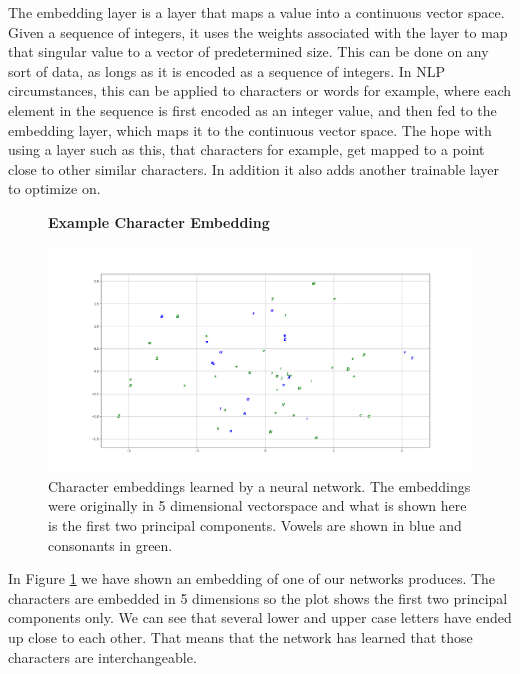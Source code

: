 \begin{description}
        The embedding layer is a layer that maps a value into a continuous
        vector space. Given a sequence of integers, it uses the weights
        associated with the layer to map that singular value to a vector of
        predetermined size. This can be done on any sort of data, as longs as it
        is encoded as a sequence of integers. In \gls{NLP} circumstances, this
        can be applied to characters or words for example, where each element in
        the sequence is first encoded as an integer value, and then fed to the
        embedding layer, which maps it to the continuous vector space. The hope
        with using a layer such as this, that characters for example, get mapped
        to a point close to other similar characters. In addition it also adds
        another trainable layer to optimize on.

        \begin{figure}
            \centering
            \textbf{Example Character Embedding}\par\medskip
            \includegraphics[width=\textwidth]{./pictures/method/example_character_embeddings.png}
            \caption{Character embeddings learned by a neural network. The
                embeddings were originally in 5 dimensional vectorspace and what
                is shown here is the first two principal components. Vowels are
                shown in blue and consonants in green.}
            \label{fig:embeddings}
        \end{figure}

        In Figure \ref{fig:embeddings} we have shown an embedding of one of our
        networks produces. The characters are embedded in 5 dimensions so the
        plot shows the first two principal components only. We can see that
        several lower and upper case letters have ended up close to each other.
        That means that the network has learned that those characters are
        interchangeable.


\end{description}

